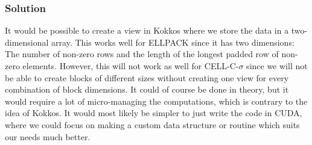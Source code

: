 \documentclass[10pt]{article}
\begin{document}
\subsubsection{Solution}
It would be possible to create a view in Kokkos where we store the data in a two-dimensional array. This works well for ELLPACK since it has two dimensions: The number of non-zero rows and the length of the longest padded row of non-zero elements. However, this will not work as well for CELL-C-$\sigma$ since we will not be able to create blocks of different sizes without creating one view for every combination of block dimensions. It could of course be done in theory, but it would require a lot of micro-managing the computations, which is contrary to the idea of Kokkos. It would most likely be simpler to just write the code in CUDA, where we could focus on making a custom data structure or routine which suits our needs much better.
\end{document}
